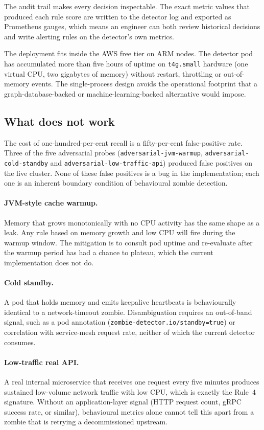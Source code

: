 \documentclass[11pt,a4paper,oneside]{article}
\begin{document}
The audit trail makes every decision inspectable. The exact metric
values that produced each rule score are written to the detector log
and exported as Prometheus gauges, which means an engineer can both
review historical decisions and write alerting rules on the
detector's own metrics.

The deployment fits inside the AWS free tier on ARM nodes. The detector
pod has accumulated more than five hours of uptime on
\texttt{t4g.small} hardware (one virtual CPU, two gigabytes of memory)
without restart, throttling or out-of-memory events. The single-process
design avoids the operational footprint that a graph-database-backed or
machine-learning-backed alternative would impose.

\subsection{What does not work}

The cost of one-hundred-per-cent recall is a fifty-per-cent false-positive
rate. Three of the five adversarial probes
(\texttt{adversarial-jvm-warmup}, \texttt{adversarial-cold-standby} and
\texttt{adversarial-low-traffic-api}) produced false positives on the
live cluster. None of these false positives is a bug in the
implementation; each one is an inherent boundary condition of behavioural
zombie detection.

\paragraph{JVM-style cache warmup.}
Memory that grows monotonically with no CPU activity has the same shape
as a leak. Any rule based on memory growth and low CPU will fire during
the warmup window. The mitigation is to consult pod uptime and
re-evaluate after the warmup period has had a chance to plateau, which
the current implementation does not do.

\paragraph{Cold standby.}
A pod that holds memory and emits keepalive heartbeats is
behaviourally identical to a network-timeout zombie. Disambiguation
requires an out-of-band signal, such as a pod annotation
(\texttt{zombie-detector.io/standby=true}) or correlation with
service-mesh request rate, neither of which the current detector
consumes.

\paragraph{Low-traffic real API.}
A real internal microservice that receives one request every five
minutes produces sustained low-volume network traffic with low CPU,
which is exactly the Rule~4 signature. Without an
application-layer signal (HTTP request count, gRPC success rate, or
similar), behavioural metrics alone cannot tell this apart from a
zombie that is retrying a decommissioned upstream.
\end{document}
